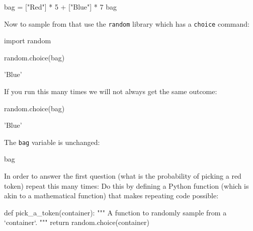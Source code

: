 \begin{pyin}
bag = ["Red"] * 5 + ["Blue"] * 7
bag
\end{pyin}





\begin{raw}
\end{raw}

Now to sample from that use the \texttt{random} library which has a \texttt{choice}
command:

\begin{pyin}
import random

random.choice(bag)
\end{pyin}





\begin{raw}
'Blue'
\end{raw}

If you run this many times we will not always get the same outcome:

\begin{pyin}
random.choice(bag)
\end{pyin}





\begin{pyin}
'Blue'
\end{pyin}

The \texttt{bag} variable is unchanged:

\begin{pyin}
bag
\end{pyin}

\begin{pyin}
\end{pyin}





In order to answer the first question (what is the probability of picking a red
token) repeat this many times:
Do this by defining a Python function (which is akin to a mathematical
function) that makes repeating code possible:




\begin{pyin}
def pick_a_token(container):
    """
    A function to randomly sample from a `container`.
    """
    return random.choice(container)
\end{pyin}


